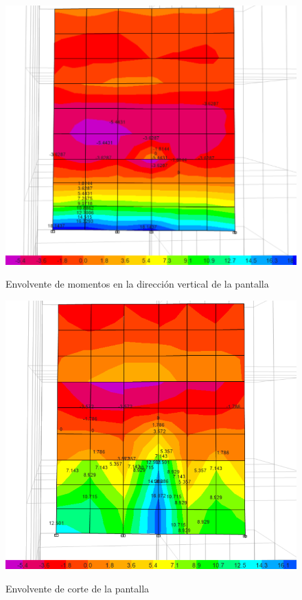 \begin{figure}[h!]
    \centering
    \caption{Envolvente de momentos en la dirección vertical de la pantalla}
    \includegraphics[scale=0.6]{IMAGENES/m22.PNG}
    \label{m22}
\end{figure} 
\newpage
\begin{figure}[h!]
    \centering
    \caption{Envolvente de corte de la pantalla}
    \includegraphics[scale=0.6]{IMAGENES/v23.PNG}
    \label{v23}
\end{figure}
